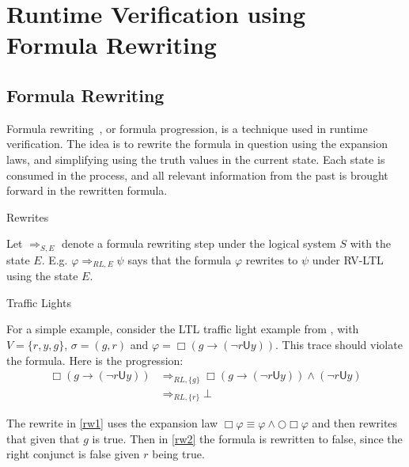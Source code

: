 \documentclass[a4paper]{article}
\newcommand{\U}{\mathsf{U}}
\newcommand{\rw}[1]{\Rightarrow_{#1}}
\begin{document}

\section{Runtime Verification using Formula Rewriting}
\subsection{Formula Rewriting}
Formula rewriting~\autocite{rosu2005rewriting}, or formula progression, is a technique used in runtime verification.
The idea is to rewrite the formula in question using the expansion laws, and simplifying using the truth values in the current state.
Each state is consumed in the process, and all relevant information from the past is brought forward in the rewritten formula.

\begin{notn}{Rewrites}

Let $\rw{S,E}$ denote a formula rewriting step under the logical system $S$ with the state $E$. E.g. $\varphi\rw{RL,E}\psi$ says that the formula $\varphi$ rewrites to $\psi$ under RV-LTL using the state $E$.
\end{notn}

\begin{eg}{Traffic Lights}

For a simple example, consider the LTL traffic light example from \textcite[175]{rosu2005rewriting}, with $V=\{r,y,g\}$, $\sigma = ({g},{r})$ and $\varphi = \Box (g \to (\neg r \U y))$. This trace should violate the formula. Here is the progression:
\begin{align}
  \Box (g \to (\neg r \U y)) &\rw{RL,\{g\}} \Box (g \to (\neg r \U y)) \land (\neg r \U y)\label{rw1}\\
  &\rw{RL,\{r\}} \bot\label{rw2}
\end{align}

The rewrite in \eqref{rw1} uses the expansion law $\Box \varphi \equiv \varphi \land \bigcirc \Box \varphi$ and then rewrites that given that $g$ is true.
Then in \eqref{rw2} the formula is rewritten to false, since the right conjunct is false given $r$ being true.
\end{eg}
\end{document}
